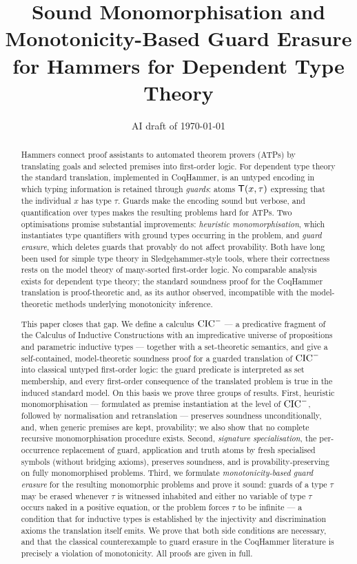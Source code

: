 \documentclass[11pt]{article}
\title{Sound Monomorphisation and Monotonicity-Based Guard Erasure\\
for Hammers for Dependent Type Theory}
\author{}
\date{AI draft of \today}
\numberwithin{equation}{section}
\begin{document}
\maketitle

\begin{abstract}
Hammers connect proof assistants to automated theorem provers (ATPs)
by translating goals and selected premises into first-order logic.
For dependent type theory the standard translation, implemented in
CoqHammer, is an untyped encoding in which typing information is
retained through \emph{guards}: atoms $\mathsf{T}(x,\tau)$ expressing
that the individual $x$ has type $\tau$.  Guards make the encoding
sound but verbose, and quantification over types makes the resulting
problems hard for ATPs.  Two optimisations promise substantial
improvements: \emph{heuristic monomorphisation}, which instantiates
type quantifiers with ground types occurring in the problem, and
\emph{guard erasure}, which deletes guards that provably do not
affect provability.  Both have long been used for simple type theory
in Sledgehammer-style tools, where their correctness rests on the
model theory of many-sorted first-order logic.  No comparable
analysis exists for dependent type theory; the standard soundness
proof for the CoqHammer translation is proof-theoretic and, as its
author observed, incompatible with the model-theoretic methods
underlying monotonicity inference.

This paper closes that gap.  We define a calculus $\mathrm{CIC}^{-}$ --- a
predicative fragment of the Calculus of Inductive Constructions with
an impredicative universe of propositions and parametric inductive
types --- together with a set-theoretic semantics, and give a
self-contained, model-theoretic soundness proof for a guarded
translation of $\mathrm{CIC}^{-}$ into classical untyped first-order logic: the
guard predicate is interpreted as set membership, and every
first-order consequence of the translated problem is true in the
induced standard model.  On this basis we prove three groups of
results.  First, heuristic monomorphisation --- formulated as
premise instantiation at the level of $\mathrm{CIC}^{-}$, followed by
normalisation and retranslation --- preserves soundness
unconditionally, and, when generic premises are kept, provability;
we also show that no complete recursive monomorphisation procedure
exists.  Second, \emph{signature specialisation}, the per-occurrence
replacement of guard, application and truth atoms by fresh
specialised symbols (without bridging axioms), preserves soundness,
and is provability-preserving on fully monomorphised problems.
Third, we formulate \emph{monotonicity-based guard erasure} for the
resulting monomorphic problems and prove it sound: guards of a type
$\tau$ may be erased whenever $\tau$ is witnessed inhabited and
either no variable of type $\tau$ occurs naked in a positive
equation, or the problem forces $\tau$ to be infinite --- a condition
that for inductive types is established by the injectivity and
discrimination axioms the translation itself emits.  We prove that
both side conditions are necessary, and that the classical
counterexample to guard erasure in the CoqHammer literature is
precisely a violation of monotonicity.  All proofs are given in
full.
\end{abstract}
\end{document}
